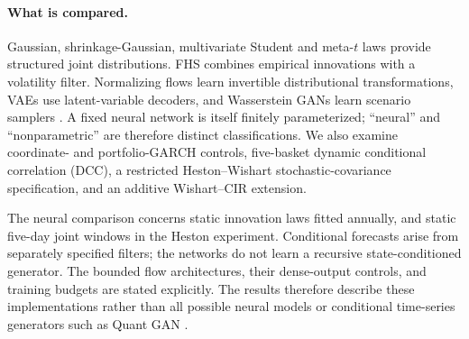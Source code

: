 \documentclass[11pt]{article}
\theoremstyle{definition}\newtheorem{definition}[theorem]{Definition}
\theoremstyle{remark}\newtheorem{remark}[theorem]{Remark}
\begin{document}
\paragraph{What is compared.}
Gaussian, shrinkage-Gaussian, multivariate Student and meta-$t$ laws provide structured joint distributions. FHS combines empirical innovations with a volatility filter. Normalizing flows learn invertible distributional transformations, VAEs use latent-variable decoders, and Wasserstein GANs learn scenario samplers \citep{papamakarios2021review,kingma2014vae,goodfellow2014gan}. A fixed neural network is itself finitely parameterized; ``neural'' and ``nonparametric'' are therefore distinct classifications. We also examine coordinate- and portfolio-GARCH controls, five-basket dynamic conditional correlation (DCC), a restricted Heston--Wishart stochastic-covariance specification, and an additive Wishart--CIR extension.

The neural comparison concerns static innovation laws fitted annually, and static five-day joint windows in the Heston experiment. Conditional forecasts arise from separately specified filters; the networks do not learn a recursive state-conditioned generator. The bounded flow architectures, their dense-output controls, and training budgets are stated explicitly. The results therefore describe these implementations rather than all possible neural models or conditional time-series generators such as Quant GAN \citep{wiese2020quantgan,buehler2020simulator}.
\end{document}
